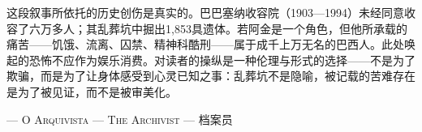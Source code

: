 \vspace{0.8em}
\noindent 这段叙事所依托的历史创伤是真实的。巴巴塞纳收容院（1903—1994）未经同意收容了六万多人；其乱葬坑中掘出1,853具遗体。若阿金是一个角色，但他所承载的痛苦——饥饿、流离、囚禁、精神科酷刑——属于成千上万无名的巴西人。此处唤起的恐怖不应作为娱乐消费。对读者的操纵是一种伦理与形式的选择——不是为了欺骗，而是为了让身体感受到心灵已知之事：乱葬坑不是隐喻，被记载的苦难存在是为了被见证，而不是被审美化。

\vspace{0.8em}

\vspace{1.4em}
\hfill{\scshape --- O Arquivista --- The Archivist --- 档案员}\hspace{1em}

\endgroup
\clearpage
